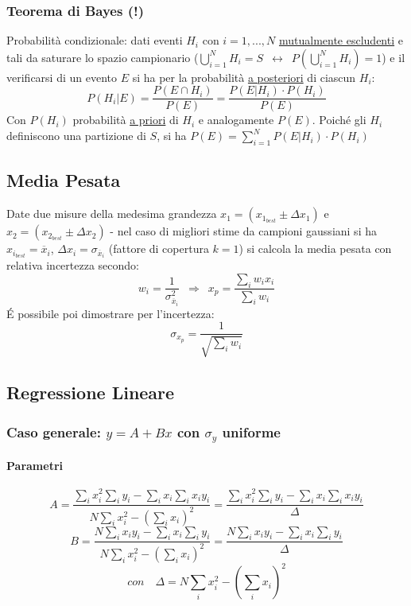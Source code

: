 \documentclass[11pt]{article}
\begin{document}
\subsubsection*{Teorema di Bayes (!)}
Probabilità condizionale: dati eventi $H_i$ con $i = 1, ..., N$ \underline{mutualmente escludenti} e tali da saturare lo spazio campionario ($\bigcup \limits_{i=1}^{N} H_i = S \enspace \leftrightarrow \enspace P(\bigcup \limits_{i=1}^{N} H_i) = 1$) e il verificarsi di un evento $E$ si ha per la probabilità \underline{a posteriori} di ciascun $H_i$:
\[P(H_i | E) = \frac{P(E \cap H_i)}{P(E)} = \frac{P(E | H_i) \cdot P(H_i)}{P(E)}\]
Con $P(H_i)$ probabilità \underline{a priori} di $H_i$ e analogamente $P(E)$. Poiché gli $H_i$ definiscono una partizione di $S$, si ha $P(E) = \sum_{i=1}^N P(E | H_i) \cdot P(H_i)$

\subsection{Media Pesata}
Date due misure della medesima grandezza $x_1 = (x_{1_{best}} \pm \Delta x_1)$ e $x_2 = (x_{2_{best}} \pm \Delta x_2)$ - nel caso di migliori stime da campioni gaussiani si ha $x_{i_{best}} = \overline{x}_i$, $\Delta x_i = \sigma_{\overline{x}_i}$ (fattore di copertura $k = 1$) si calcola la media pesata con relativa incertezza secondo:
\[w_i = \frac{1}{\sigma_{\overline{x}_i}^2} \enspace \Rightarrow \enspace x_p = \frac{\sum_i w_i x_i}{\sum_i w_i}\]
\'E possibile poi dimostrare per l'incertezza:
\[\sigma_{x_p} = \frac{1}{\sqrt{\sum_i w_i}}\]

\subsection{Regressione Lineare}
\subsubsection*{Caso generale: $y = A + Bx$ con $\sigma_y$ uniforme}
\paragraph{Parametri}
\[A = \frac{\sum_i x_i^2 \sum_i y_i - \sum_i x_i \sum_i x_i y_i}{N \sum_i x_i^2 - (\sum_i x_i)^2} = \frac{\sum_i x_i^2 \sum_i y_i - \sum_i x_i \sum_i x_i y_i}{\Delta}\] 
\[B = \frac{N \sum_i x_i y_i - \sum_i x_i \sum_i y_i}{N \sum_i x_i^2 - (\sum_i x_i)^2} = \frac{N \sum_i x_i y_i - \sum_i x_i \sum_i y_i}{\Delta}\]
\[con \quad \Delta = N \sum_i x_i^2 - (\sum_i x_i)^2\]
\end{document}

